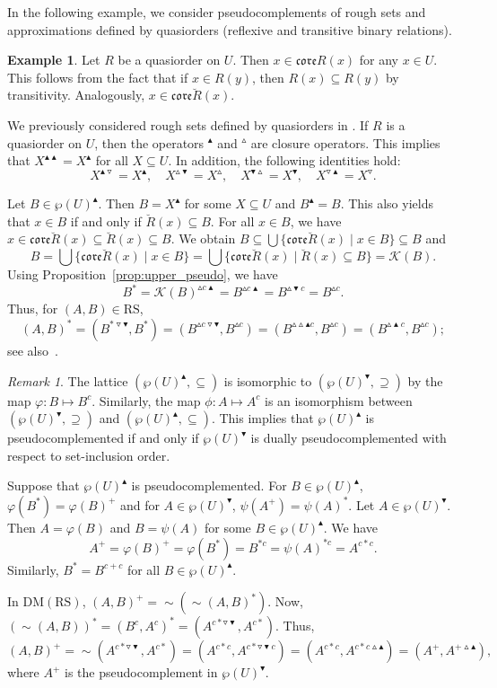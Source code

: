 \documentclass[11pt,a4paper]{amsart}
\newcommand{\UP}{\blacktriangle}
\newcommand{\DOWN}{\blacktriangledown}
\newcommand{\Up}{\vartriangle}
\newcommand{\Down}{\triangledown}
\theoremstyle{plain}
\theoremstyle{definition}
\newtheorem{example}[theorem]{Example}
\theoremstyle{remark}
\newtheorem{remark}[theorem]{Remark}
\numberwithin{equation}{section}
\begin{document}
In the following example, we consider pseudocomplements of rough sets and approximations 
defined by quasiorders (reflexive and transitive binary relations).

\begin{example} \label{ex:quasiorder_pseudo}
Let $R$ be a quasiorder on $U$. Then 
$x \in \mathfrak{core}R(x)$ for any $x \in U$. 
This follows from the fact that if $x \in R(y)$, then  
$R(x) \subseteq R(y)$ by transitivity. Analogously, 
$x \in \mathfrak{core}\breve{R}(x)$.

We previously considered rough sets defined by quasiorders 
in \cite{JarRadVer09}.
If $R$ is a quasiorder on $U$, then the operators
$^\UP$ and $^\Up$ are closure operators. This implies that
$X^{\UP \UP} = X^\UP$ for all $X \subseteq U$.
In addition, the following identities hold:
\[ X^{\UP\Down} = X^\UP, \quad
X^{\Up\DOWN} = X^\Up, \quad
X^{\DOWN\Up} = X^\DOWN, \quad
X^{\Down\UP} = X^\Down.
\]

Let $B \in \wp(U)^\UP$. Then $B = X^\UP$ for some
$X \subseteq U$ and $B^\UP = B$. 
This also yields that 
$x \in B$ if and only if $\breve{R}(x) \subseteq B$.
For all $x \in B$, we have 
$x \in \mathfrak{core}\breve{R}(x) \subseteq
\breve{R}(x) \subseteq B$. We obtain
$B \subseteq 
\bigcup \{ \mathfrak{core}\breve{R}(x) \mid x \in B\} \subseteq B$ and 
\[
B = \bigcup \{\mathfrak{core}\breve{R}(x) \mid x \in B\} 
= \bigcup \{\mathfrak{core}\breve{R}(x) \mid 
\breve{R}(x) \subseteq B\} 
= \mathcal{K}(B).
\]
Using Proposition~\ref{prop:upper_pseudo}, we have
\[B^* =  \mathcal{K}(B)^{\Up c \UP} 
= B^{\Up c \UP} =  B^{\Up \DOWN c} = B^{\Up c}.
\]
Thus, for $(A,B) \in \mathrm{RS}$,
\[
(A,B)^* = (B^{* \Down \DOWN}, B^*) =
(B^{\Up c \Down \DOWN}, B^{\Up c}) =
(B^{\Up \Up \UP c}, B^{\Up c}) =
(B^{ \Up \UP c}, B^{\Up c});
\]
see also~\cite[p.~409]{JarvRadeRivi24}.
\end{example}


\begin{remark}
The lattice $(\wp(U)^\UP, \subseteq)$ is isomorphic to 
$(\wp(U)^\DOWN, \supseteq)$ by the map $\varphi \colon B \mapsto B^c$. Similarly, the map $\phi \colon A \mapsto A^c$ is an isomorphism between 
$(\wp(U)^\DOWN, \supseteq)$ and $(\wp(U)^\UP, \subseteq)$. 
This implies that $\wp(U)^\UP$ is pseudocomplemented if and only if 
$\wp(U)^\DOWN$ is dually pseudocomplemented with respect to set-inclusion order.

Suppose that $\wp(U)^\UP$ is pseudocomplemented.
For $B \in \wp(U)^\UP$, $\varphi(B^*) = 
\varphi(B)^+$ and for $A \in \wp(U)^\DOWN$, 
$\psi(A^+) = \psi(A)^*$. 
Let $A \in \wp(U)^\DOWN$. Then $A = \varphi(B)$ and $B = \psi(A)$
for some $B \in \wp(U)^\UP$. We have
\[  A^+ = \varphi(B)^+ = \varphi(B^*) = B^{* c} =
     \psi(A)^{* c} = A^{c * c}.\]
Similarly, $B^* = B^{c+c}$ for all $B \in \wp(U)^\UP$.

In $\mathrm{DM(RS)}$, $(A,B)^+ = {\sim}({\sim}(A,B)^*)$. Now,
$({\sim}(A,B))^* = (B^c,A^c)^* = (A^{c * \Down \DOWN}, A^{c *})$.
Thus, 
\[ (A,B)^+ =
{\sim}(A^{c * \Down \DOWN}, A^{c *}) =
(A^{c * c}, A^{c * \Down \DOWN c} )
= (A^{c * c}, A^{c * c \Up \UP} ) =
(A^+, A^{+\Up \UP}),
\]
where $A^+$ is the pseudocomplement in $\wp(U)^\DOWN$.
\end{remark}
\end{document}
